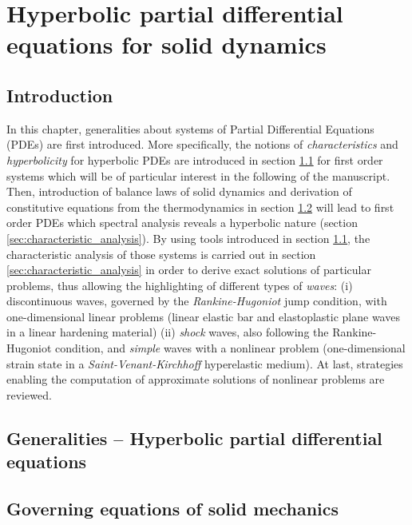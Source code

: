 \chapter{Hyperbolic partial differential equations for solid dynamics}

\section*{Introduction}
In this chapter, generalities about systems of Partial Differential Equations (PDEs) are first introduced. More specifically, the notions of \textit{characteristics} and \textit{hyperbolicity} for hyperbolic PDEs are introduced in section \ref{sec:PDEs} for first order systems which will be of particular interest in the following of the manuscript.
Then, introduction of balance laws of solid dynamics and derivation of constitutive equations from the thermodynamics in section \ref{sec:solidMech_equations} will lead to first order PDEs which spectral analysis reveals a hyperbolic nature (section \ref{sec:characteristic_analysis}). By using tools introduced in section \ref{sec:PDEs}, the characteristic analysis of those systems is carried out in section \ref{sec:characteristic_analysis} in order to derive exact solutions of particular problems, thus allowing the highlighting of different types of \textit{waves}: (i) discontinuous waves, governed by the \textit{Rankine-Hugoniot} jump condition, with one-dimensional linear problems (linear elastic bar and elastoplastic plane waves in a linear hardening material) (ii) \textit{shock} waves, also following the Rankine-Hugoniot condition, and \textit{simple} waves with a nonlinear problem (one-dimensional strain state in a \textit{Saint-Venant-Kirchhoff} hyperelastic medium). At last, strategies enabling the computation of approximate solutions of nonlinear problems are reviewed.


\section{Generalities -- Hyperbolic partial differential equations}
\label{sec:PDEs}


\section{Governing equations of solid mechanics}
\label{sec:solidMech_equations}



